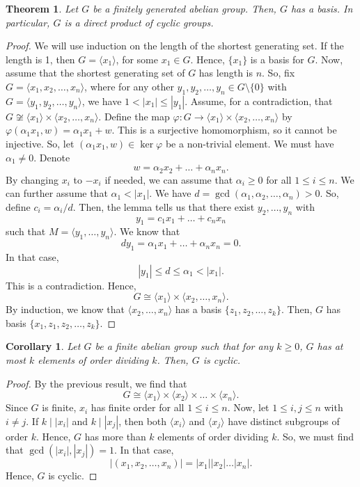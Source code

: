 \documentclass[a4paper, openany]{memoir}
\theoremstyle{definition}
\theoremstyle{plain}
\newtheorem{theorem}[definition]{Theorem}
\newtheorem{corollary}[definition]{Corollary}
\begin{document}
    \begin{theorem}
        Let $G$ be a finitely generated abelian group. Then, $G$ has a basis. In particular, $G$ is a direct product of cyclic groups.
    \end{theorem}
    \begin{proof}
        We will use induction on the length of the shortest generating set. If the length is 1, then $G = \langle x_1 \rangle$, for some $x_1 \in G$. Hence, $\{x_1\}$ is a basis for $G$. Now, assume that the shortest generating set of $G$ has length is $n$. So, fix $G = \langle x_1, x_2, \dots, x_n \rangle$, where for any other $y_1, y_2, \dots, y_n \in G \setminus \{0\}$ with $G = \langle y_1, y_2, \dots, y_n \rangle$, we have $1 < |x_1| \leq |y_1|$. Assume, for a contradiction, that $G \not\cong \langle x_1 \rangle \times \langle x_2, \dots, x_n \rangle$. Define the map $\varphi: G \to \langle x_1 \rangle \times \langle x_2, \dots, x_n \rangle$ by $\varphi(\alpha_1 x_1, w) = \alpha_1 x_1 + w$. This is a surjective homomorphism, so it cannot be injective. So, let $(\alpha_1 x_1, w) \in \ker \varphi$ be a non-trivial element. We must have $\alpha_1 \neq 0$. Denote
        \[w = \alpha_2 x_2 + \dots + \alpha_n x_n.\]
        By changing $x_i$ to $-x_i$ if needed, we can assume that $\alpha_i \geq 0$ for all $1 \leq i \leq n$. We can further assume that $\alpha_1 < |x_1|$. We have $d = \gcd(\alpha_1, \alpha_2, \dots, \alpha_n) > 0$. So, define $c_i = \alpha_i/d$. Then, the lemma tells us that there exist $y_2, \dots, y_n$ with
        \[y_1 = c_1 x_1 + \dots + c_n x_n\]
        such that $M = \langle y_1, \dots, y_n \rangle$. We know that 
        \[dy_1 = \alpha_1 x_1 + \dots + \alpha_n x_n = 0.\]
        In that case, 
        \[|y_1| \leq d \leq \alpha_1 < |x_1|.\]
        This is a contradiction. Hence, 
        \[G \cong \langle x_1 \rangle \times \langle x_2, \dots, x_n \rangle.\]
        By induction, we know that $\langle x_2, \dots, x_n \rangle$ has a basis $\{z_1, z_2, \dots, z_k\}$. Then, $G$ has basis $\{x_1, z_1, z_2, \dots, z_k\}$.
    \end{proof}

    \begin{corollary}
        Let $G$ be a finite abelian group such that for any $k \geq 0$, $G$ has at most $k$ elements of order dividing $k$. Then, $G$ is cyclic.
    \end{corollary}
    \begin{proof}
        By the previous result, we find that 
        \[G \cong \langle x_1 \rangle \times \langle x_2 \rangle \times \dots \times \langle x_n \rangle.\]
        Since $G$ is finite, $x_i$ has finite order for all $1 \leq i \leq n$. Now, let $1 \leq i, j \leq n$ with $i \neq j$. If $k \mid |x_i|$ and $k \mid |x_j|$, then both $\langle x_i \rangle$ and $\langle x_j \rangle$ have distinct subgroups of order $k$. Hence, $G$ has more than $k$ elements of order dividing $k$. So, we must find that $\gcd(|x_i|, |x_j|) = 1$. In that case,
        \[|(x_1, x_2, \dots, x_n)| = \lvert x_1 \rvert \lvert x_2 \rvert \dots \lvert x_n \rvert.\]
        Hence, $G$ is cyclic.
    \end{proof}
\end{document}
